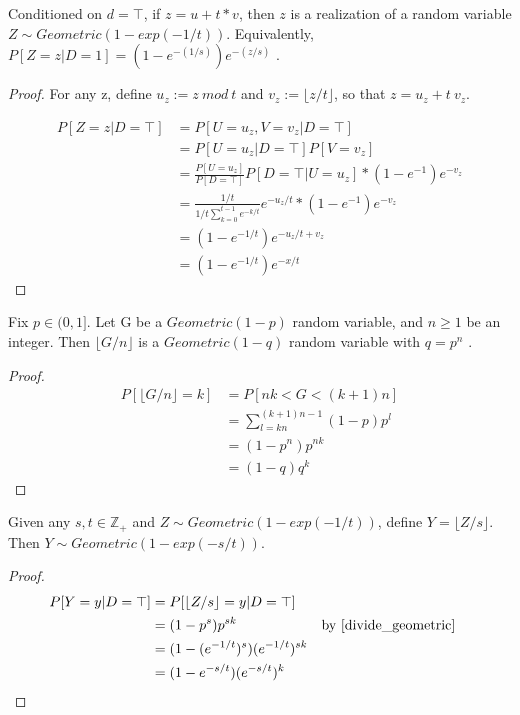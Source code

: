 \documentclass{article}
\begin{document}
\begin{lemma}
\label{geom_1_t}
Conditioned on $d = \top$, if $z = u + t * v$, then $z$ is a realization of a random variable $Z \sim Geometric(1 - exp(-1/t))$. Equivalently, $P[Z=z | D=1] = (1 - e^{-(1/s)}) e^{-(z/s)}$ \cite{CKS20}.
\end{lemma}

\begin{proof}
For any z, define $u_z := z \ mod \ t$ and $v_z := \lfloor z/t \rfloor$, so that $z = u_z + t \ v_z$. 

\begin{align*}
    P[Z=z | D=\top] &= P[U = u_z, V = v_z | D = \top] \\
    &= P[U = u_z | D = \top] P[V = v_z] \\
    &= \frac{P[U = u_z]}{P[D=\top]} P[D=\top | U = u_z] * (1 - e^{-1}) e^{-v_z} \\
    &= \frac{1/t}{1/t \sum_{k=0}^{t-1}e^{-k/t}} e^{-u_z/t} * (1 - e^{-1}) e^{-v_z} \\
    &= (1 - e^{-1/t}) e^{-u_z/t + v_z} \\
    &= (1 - e^{-1/t}) e^{-x/t}
\end{align*}
\end{proof}



\begin{lemma}
\label{divide_geometric}
Fix $p \in (0, 1]$. Let G be a $Geometric(1 - p)$ random variable, and $n \geq 1$ be an integer. Then $\lfloor G / n \rfloor$ is a $Geometric(1 - q)$ random variable with $q = p^n$ \cite{CKS20}.
\end{lemma}

\begin{proof}
\begin{align*}
    P[\lfloor G/n \rfloor = k] &= P[nk < G < (k + 1)n] \\
    &= \sum_{l=kn}^{(k+1)n - 1} (1 - p)p^l \\
    &= (1 - p^n)p^{nk} \\
    &= (1 - q)q^k
\end{align*}
\end{proof}

\begin{theorem} 
\label{geom_s_t}
Given any $s,t \in \mathbb{Z}_+$ and $Z \sim Geometric(1-exp(-1/t))$, 
define $Y = \lfloor Z / s \rfloor$.
Then $Y \sim Geometric(1 - exp(-s/t))$\cite{CKS20}.
\end{theorem}

\begin{proof}
\begin{align*}
    P[Y = y | D = \top] &= P[\lfloor Z/s \rfloor = y | D = \top] \\
    &= (1 - p^s) p^{sk} && \text{by } \ref{divide_geometric} \\
    &= (1 - (e^{-1/t})^s) (e^{-1/t})^{sk} \\
    &= (1 - e^{-s/t}) (e^{-s/t})^k
\end{align*}
\end{proof}
\end{document}
